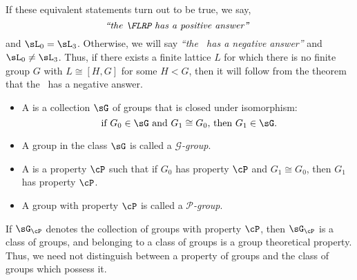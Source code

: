 \begin{frame}[fragile,label=LocalStructureNegAnswer]{}
If these equivalent statements turn out to be true, we say,
\[\text{\emph{``the \FLRP\ has a positive answer''}  }\] and $\sL_0 = \sL_3$.
Otherwise, we will say 
\emph{``the \FLRP\ has a negative answer''} 
and $\sL_0 \neq \sL_3$.
\vskip4mm Thus, if there exists a finite lattice $L$ for which 
there is no finite group $G$ with $L \cong [H,G]$ for some $H< G$,
then it will follow from the theorem that the \FLRP\ has a negative answer.
\end{frame}








\begin{frame}[label=ClassProp]{}
  \begin{itemize}
  \item  A  is a
    collection $\sG$ of groups that is closed under isomorphism:
    \[
    \text{ if $G_0\in \sG$ and  $G_1\cong G_0$, then $G_1\in \sG$.}
    \]
\vskip5pt
\item[] A group in the class $\sG$ is called a \emph{$\mathscr{G}$-group}.
  \vskip14mm
  \item A 
    is a property $\cP$ such that if $G_0$ has property $\cP$ and
    $G_1\cong G_0$, then $G_1$ has property $\cP$.
\vskip5pt
\item[] A group with property $\cP$ is called a \emph{$\mathcal{P}$-group}.  
  \end{itemize}
\end{frame}

\begin{frame}[label=ClassProp]{}
If $\sG_{\cP}$ denotes the collection of groups with property $\cP$, then
  $\sG_{\cP}$  is a class of groups, and belonging to a class of groups is a
  group theoretical property. \\[6pt]
Thus, we need not distinguish between a property of groups and the
  class of groups which possess it.
\vskip2cm
\end{frame}

